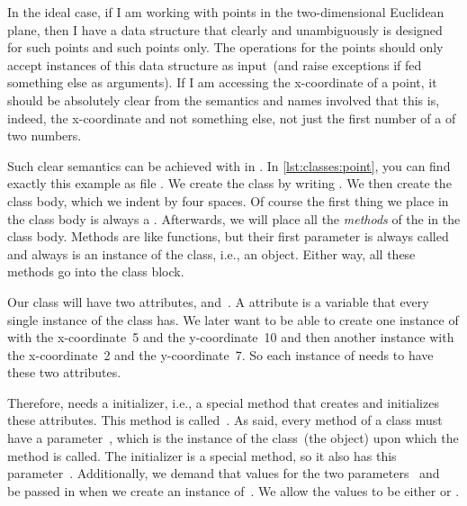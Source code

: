 In the ideal case, if I am working with points in the two-dimensional Euclidean plane, then I have a data structure that clearly and unambiguously is designed for such points and such points only.
The operations for the points should only accept instances of this data structure as input~(and raise exceptions if fed something else as arguments).
If I am accessing the x\nobreakdashes-coordinate of a point, it should be absolutely clear from the semantics and names involved that this is, indeed, the x\nobreakdashes-coordinate and not something else, not just the first number of a  of two numbers.

Such clear semantics can be achieved with  in \python.
In \cref{lst:classes:point}, you can find exactly this example as file .
We create the class  by writing .
We then create the class body, which we indent by four spaces.
Of course the first thing we place in the class body is always a .%
%
%
%
Afterwards, we will place all the \emph{methods} of the  in the class body.
Methods are like functions, but their first parameter is always called  and always is an instance of the class, i.e., an object.
Either way, all these methods go into the class block.

Our class  will have two attributes,  and~.
A attribute is a variable that every single instance of the class has.
We later want to be able to create one instance of  with the x\nobreakdashes-coordinate~5 and the y\nobreakdashes-coordinate~10 and then another instance with the x\nobreakdashes-coordinate~2 and the y\nobreakdashes-coordinate~7.
So each instance of  needs to have these two attributes.

Therefore,  needs a initializer, i.e., a special method that creates and initializes these attributes.
This method is called~.
As said, every method of a class must have a parameter~, which is the instance of the class~(the object) upon which the method is called.
The initializer  is a special method, so it also has this parameter~.
Additionally, we demand that values for the two parameters~ and~ be passed in when we create an instance of~.
We allow the values to be either  or .


